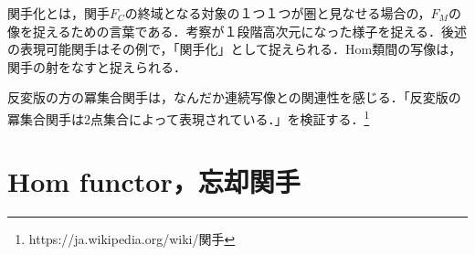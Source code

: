 \documentclass[uplatex, 12pt, dvipdfmx]{jsreport}
\begin{document}
\begin{screen}関手化とは，関手$F_C$の終域となる対象の１つ１つが圏と見なせる場合の，$F_M$の像を捉えるための言葉である．考察が１段階高次元になった様子を捉える．後述の表現可能関手はその例で，「関手化」として捉えられる．Hom類間の写像は，関手の射をなすと捉えられる．
\end{screen}

反変版の方の冪集合関手は，なんだか連続写像との関連性を感じる．「反変版の冪集合関手は2点集合によって表現されている．」を検証する．\footnote{https://ja.wikipedia.org/wiki/関手}

\section{Hom functor，忘却関手}\label{section-hom-functor}
\end{document}

